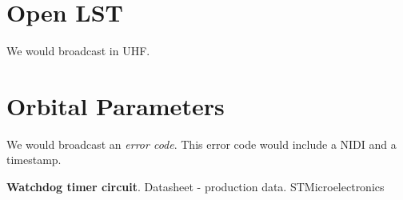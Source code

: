 \documentclass[10pt]{amsart}
\begin{document}
\section{Open LST}

We would broadcast in UHF.

\section{Orbital Parameters}

We would broadcast an \emph{error code}. This error code would include a NIDI and a timestamp.


\begin{thebibliography}{9}

\textbf{Watchdog timer circuit}. Datasheet - production data. STMicroelectronics



\end{thebibliography}
\end{document}
